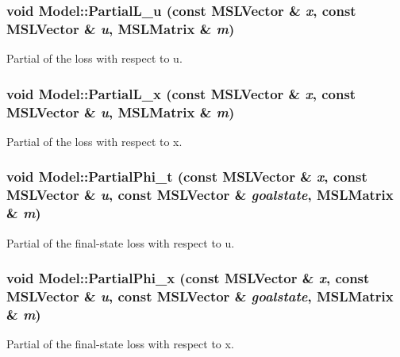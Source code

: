 \subsubsection{\setlength{\rightskip}{0pt plus 5cm}void Model::Partial\-L\_\-u (const {\bf MSLVector} \& {\em x}, const {\bf MSLVector} \& {\em u}, {\bf MSLMatrix} \& {\em m})\hspace{0.3cm}{\tt  [inline, virtual]}}\label{classModel_a14}


Partial of the loss with respect to u.

\subsubsection{\setlength{\rightskip}{0pt plus 5cm}void Model::Partial\-L\_\-x (const {\bf MSLVector} \& {\em x}, const {\bf MSLVector} \& {\em u}, {\bf MSLMatrix} \& {\em m})\hspace{0.3cm}{\tt  [inline, virtual]}}\label{classModel_a13}


Partial of the loss with respect to x.

\subsubsection{\setlength{\rightskip}{0pt plus 5cm}void Model::Partial\-Phi\_\-t (const {\bf MSLVector} \& {\em x}, const {\bf MSLVector} \& {\em u}, const {\bf MSLVector} \& {\em goalstate}, {\bf MSLMatrix} \& {\em m})\hspace{0.3cm}{\tt  [inline, virtual]}}\label{classModel_a17}


Partial of the final-state loss with respect to u.

\subsubsection{\setlength{\rightskip}{0pt plus 5cm}void Model::Partial\-Phi\_\-x (const {\bf MSLVector} \& {\em x}, const {\bf MSLVector} \& {\em u}, const {\bf MSLVector} \& {\em goalstate}, {\bf MSLMatrix} \& {\em m})\hspace{0.3cm}{\tt  [inline, virtual]}}\label{classModel_a16}


Partial of the final-state loss with respect to x.

